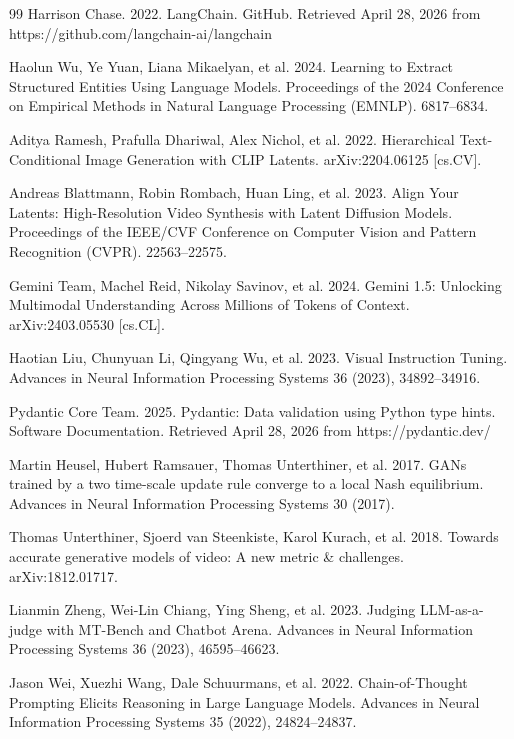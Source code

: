 \documentclass[sigconf]{acmart}
\begin{document}
\begin{thebibliography}{99}
Harrison Chase. 2022. LangChain. GitHub. Retrieved April 28, 2026 from https://github.com/langchain-ai/langchain

Haolun Wu, Ye Yuan, Liana Mikaelyan, et al. 2024. Learning to Extract Structured Entities Using Language Models. Proceedings of the 2024 Conference on Empirical Methods in Natural Language Processing (EMNLP). 6817--6834.

Aditya Ramesh, Prafulla Dhariwal, Alex Nichol, et al. 2022. Hierarchical Text-Conditional Image Generation with CLIP Latents. arXiv:2204.06125 [cs.CV].

Andreas Blattmann, Robin Rombach, Huan Ling, et al. 2023. Align Your Latents: High-Resolution Video Synthesis with Latent Diffusion Models. Proceedings of the IEEE/CVF Conference on Computer Vision and Pattern Recognition (CVPR). 22563--22575.

Gemini Team, Machel Reid, Nikolay Savinov, et al. 2024. Gemini 1.5: Unlocking Multimodal Understanding Across Millions of Tokens of Context. arXiv:2403.05530 [cs.CL].

Haotian Liu, Chunyuan Li, Qingyang Wu, et al. 2023. Visual Instruction Tuning. Advances in Neural Information Processing Systems 36 (2023), 34892--34916.

Pydantic Core Team. 2025. Pydantic: Data validation using Python type hints. Software Documentation. Retrieved April 28, 2026 from https://pydantic.dev/

Martin Heusel, Hubert Ramsauer, Thomas Unterthiner, et al. 2017. GANs trained by a two time-scale update rule converge to a local Nash equilibrium. Advances in Neural Information Processing Systems 30 (2017).

Thomas Unterthiner, Sjoerd van Steenkiste, Karol Kurach, et al. 2018. Towards accurate generative models of video: A new metric \& challenges. arXiv:1812.01717.

Lianmin Zheng, Wei-Lin Chiang, Ying Sheng, et al. 2023. Judging LLM-as-a-judge with MT-Bench and Chatbot Arena. Advances in Neural Information Processing Systems 36 (2023), 46595--46623.

Jason Wei, Xuezhi Wang, Dale Schuurmans, et al. 2022. Chain-of-Thought Prompting Elicits Reasoning in Large Language Models. Advances in Neural Information Processing Systems 35 (2022), 24824--24837.


\end{thebibliography}
\end{document}
